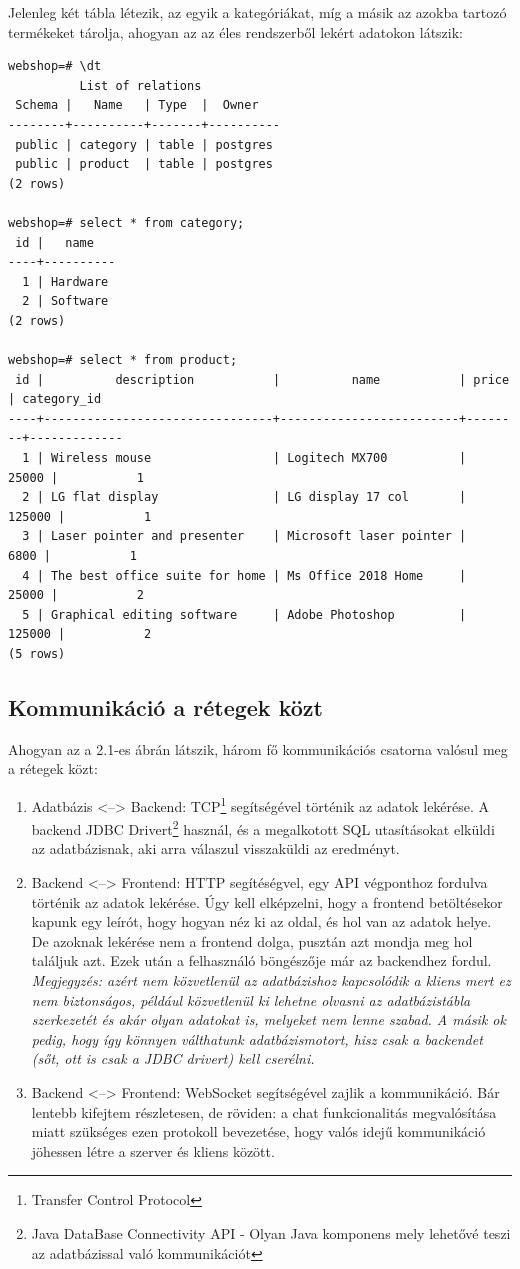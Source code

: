 Jelenleg két tábla létezik, az egyik a kategóriákat, míg a másik az azokba tartozó termékeket tárolja, ahogyan az az éles rendszerből lekért adatokon látszik:
\begin{lstlisting}
webshop=# \dt
          List of relations
 Schema |   Name   | Type  |  Owner
--------+----------+-------+----------
 public | category | table | postgres
 public | product  | table | postgres
(2 rows)

webshop=# select * from category;
 id |   name
----+----------
  1 | Hardware
  2 | Software
(2 rows)

webshop=# select * from product;
 id |          description           |          name           | price  | category_id
----+--------------------------------+-------------------------+--------+-------------
  1 | Wireless mouse                 | Logitech MX700          |  25000 |           1
  2 | LG flat display                | LG display 17 col       | 125000 |           1
  3 | Laser pointer and presenter    | Microsoft laser pointer |   6800 |           1
  4 | The best office suite for home | Ms Office 2018 Home     |  25000 |           2
  5 | Graphical editing software     | Adobe Photoshop         | 125000 |           2
(5 rows)
\end{lstlisting}
\subsection{Kommunikáció a rétegek közt}
Ahogyan az a 2.1-es ábrán látszik, három fő kommunikációs csatorna valósul meg a rétegek közt:
\begin{enumerate}
    \item Adatbázis <--> Backend: TCP\footnote{Transfer Control Protocol} segítségével történik az adatok lekérése. A backend JDBC Drivert\footnote{Java DataBase Connectivity API - Olyan Java komponens mely lehetővé teszi az adatbázissal való kommunikációt} használ, és a megalkotott SQL utasításokat elküldi az adatbázisnak, aki arra válaszul visszaküldi az eredményt.
    \item Backend <--> Frontend: HTTP segítéségvel, egy API végponthoz fordulva történik az adatok lekérése. Úgy kell elképzelni, hogy a frontend betöltésekor kapunk egy leírót, hogy hogyan néz ki az oldal, és hol van az adatok helye. De azoknak lekérése nem a frontend dolga, pusztán azt mondja meg hol találjuk azt. Ezek után a felhasználó böngészője már az backendhez fordul.
    \vskip 0.1in
    \textit{Megjegyzés: azért nem közvetlenül az adatbázishoz kapcsolódik a kliens mert ez nem biztonságos, például közvetlenül ki lehetne olvasni az adatbázistábla szerkezetét és akár olyan adatokat is, melyeket nem lenne szabad. A másik ok pedig, hogy így könnyen válthatunk adatbázismotort, hisz csak a backendet (sőt, ott is csak a JDBC drivert) kell cserélni.}
    \item Backend <--> Frontend: WebSocket segítségével zajlik a kommunikáció. Bár lentebb kifejtem részletesen, de röviden: a chat funkcionalitás megvalósítása miatt szükséges ezen protokoll bevezetése, hogy valós idejű kommunikáció jöhessen létre a szerver és kliens között.         
\end{enumerate}
\newpage
